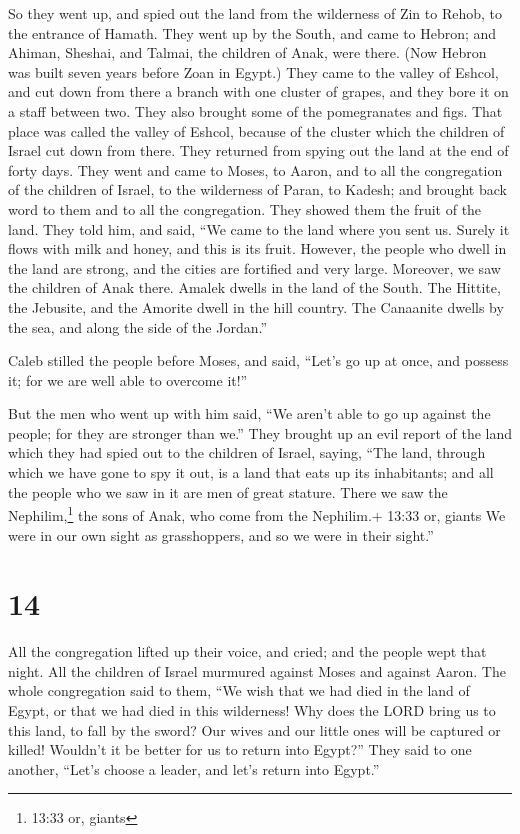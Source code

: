 So they went up, and spied out the land from the
wilderness of Zin to Rehob, to the entrance of Hamath. 
They went up by the South, and came to Hebron; and Ahiman, Sheshai, and
Talmai, the children of Anak, were there. (Now Hebron was built seven
years before Zoan in Egypt.)  They came to the valley of
Eshcol, and cut down from there a branch with one cluster of grapes, and
they bore it on a staff between two. They also brought some of the
pomegranates and figs.  That place was called the valley of
Eshcol, because of the cluster which the children of Israel cut down
from there.  They returned from spying out the land at the
end of forty days.  They went and came to Moses, to Aaron,
and to all the congregation of the children of Israel, to the wilderness
of Paran, to Kadesh; and brought back word to them and to all the
congregation. They showed them the fruit of the land.  They
told him, and said, ``We came to the land where you sent us. Surely it
flows with milk and honey, and this is its fruit.  However,
the people who dwell in the land are strong, and the cities are
fortified and very large. Moreover, we saw the children of Anak there.
 Amalek dwells in the land of the South. The Hittite, the
Jebusite, and the Amorite dwell in the hill country. The Canaanite
dwells by the sea, and along the side of the Jordan.''

 Caleb stilled the people before Moses, and said, ``Let's
go up at once, and possess it; for we are well able to overcome it!''

 But the men who went up with him said, ``We aren't able to
go up against the people; for they are stronger than we.'' 
They brought up an evil report of the land which they had spied out to
the children of Israel, saying, ``The land, through which we have gone
to spy it out, is a land that eats up its inhabitants; and all the
people who we saw in it are men of great stature.  There we
saw the Nephilim,\footnote{13:33 or, giants} the sons of Anak, who come
from the Nephilim.+ 13:33 or, giants We were in our own sight as
grasshoppers, and so we were in their sight.''

\hypertarget{section-13}{%
\section{14}\label{section-13}}

 All the congregation lifted up their voice, and cried; and
the people wept that night.  All the children of Israel
murmured against Moses and against Aaron. The whole congregation said to
them, ``We wish that we had died in the land of Egypt, or that we had
died in this wilderness!  Why does the LORD bring us to this
land, to fall by the sword? Our wives and our little ones will be
captured or killed! Wouldn't it be better for us to return into Egypt?''
 They said to one another, ``Let's choose a leader, and
let's return into Egypt.''

